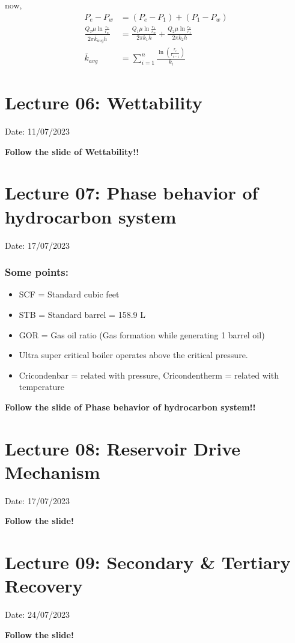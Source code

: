 \documentclass{article}
\begin{document}
now,
\begin{align*}
    P_e - P_w &= (P_e-P_1)+(P_1-P_w) \\ 
    \frac{Q_T \mu \ln \frac{r_e}{r_w}}{2\pi \overline{k}_{avg} h} &= \frac{Q_1 \mu \ln \frac{r_1}{r_w}}{2\pi k_1 h} + \frac{Q_2 \mu \ln \frac{r_e}{r_1}}{2\pi k_2 h} \\
    \overline{k}_{avg} &= \sum_{i=1}^{n} \frac{\ln \left(\frac{r_i}{r_{i-1}}\right)}{k_i}
\end{align*}

\section{Lecture 06: Wettability} 
\hfill Date: 11/07/2023

\textbf{Follow the slide of Wettability!!}
\vspace*{1cm}

\section{Lecture 07: Phase behavior of hydrocarbon system}  
\hfill Date: 17/07/2023

\subsubsection*{Some points:}
\begin{itemize}
    \item SCF = Standard cubic feet 
    \item STB = Standard barrel = 158.9 L 
    \item GOR = Gas oil ratio (Gas formation while generating 1 barrel oil)
    \item Ultra super critical boiler operates above the critical pressure. 
    \item Cricondenbar = related with pressure, Cricondentherm = related with temperature 
\end{itemize}
\textbf{Follow the slide of Phase behavior of hydrocarbon system!!} 
\vspace*{1cm}

\section{Lecture 08: Reservoir Drive Mechanism}  
\hfill Date: 17/07/2023

\textbf{Follow the slide!} 
\hrulefill

\section{Lecture 09: Secondary \& Tertiary Recovery}  
\hfill Date: 24/07/2023

\textbf{Follow the slide!} 
\hrulefill
\end{document}
